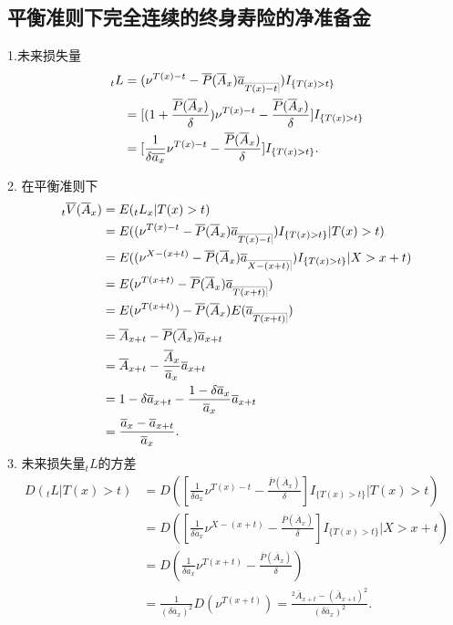 \documentclass[lang=cn,10pt]{elegantbook}
\makeatletter
\DeclareRobustCommand{\annu}[1]{_{%
    \def\arraystretch{0}%
    \setlength\arraycolsep{1pt}%
    \setlength\arrayrulewidth{.2pt}%
    \begin{array}[b]{@{}c|}\hline
        \\[\arraycolsep]%
        \scriptstyle #1%
    \end{array}%
}}
\makeatother
\begin{document}
\subsection{平衡准则下完全连续的终身寿险的净准备金}
\begin{proposition}
    1.未来损失量
\begin{align*}
    {}_tL&=(\nu^{T(x)-t}-\overline{P}( \overline{A}_x )\overline a_{\annu {T(x)-t}})I_{\{T(x)>t\}} \\
                        &= [(1+\frac{\overline{P}( \overline{A}_x )}{\delta})\nu^{T(x)-t}-\frac{\overline{P}( \overline{A}_x )}{\delta} ] I_{\{T(x)>t\}}\\
                        &= [\frac{1}{\delta\overline{a_x}}\nu^{T(x)-t}-\frac{\overline{P}( \overline{A}_x )}{\delta} ]I_{\{T(x)>t\}}.
\end{align*}

2. 在平衡准则下
\begin{align*}
    {}_t\overline V(\overline A_x)&=E({}_tL_x|T(x)>t) \\
                        &=E ( (\nu^{T(x)-t}-\overline{P}( \overline{A}_x )\overline a_{\annu {T(x)-t}} )I_{\{T(x)>t\}}|T(x)>t )\\
                        &=E ( (\nu^{X-(x+t)}-\overline{P}( \overline{A}_x )\overline a_{\annu {X-(x+t)}} )I_{\{T(x)>t\}}|X>x+t )\\
                        &=E (\nu^{T(x+t)}-\overline{P}( \overline{A}_x )\overline a_{\annu {T(x+t)}} )\\
                        &=E(\nu^{T(x+t)})-\overline{P}( \overline{A}_x )E(\overline a_{\annu {T(x+t)}})\\
                        &=\overline A_{x+t}-\overline{P}( \overline{A}_x )\overline a_{x+t}\\
                        &=\overline A_{x+t}-\frac{\overline A_x}{\overline a_x}\overline a_{x+t}\\
                        &=1-\delta\overline a_{x+t}-\frac{1-\delta \overline a_x}{\overline a_x}\overline a_{x+t}\\
                        &=\frac{\overline a_x-\overline a_{x+t}}{\overline a_x}.
\end{align*}
3. 未来损失量$_tL$的方差
\begin{align*}
    D(_tL|T(x)>t) &=D ( [\frac{1}{\delta\overline{a}_x}\nu^{T(x)-t}-\frac{\overline{P}( \overline{A}_x )}{\delta} ]I_{\{T(x)>t\}}|T(x)>t )\\
                        &=D ( [\frac{1}{\delta\overline{a}_x}\nu^{X-(x+t)}-\frac{\overline{P}( \overline{A}_x )}{\delta} ]I_{\{T(x)>t\}}|X>x+t )\\
                        &=D (\frac{1}{\delta\overline{a}_x}\nu^{T(x+t)}-\frac{\overline{P}( \overline{A}_x )}{\delta} )\\
                        &=\frac{1}{(\delta\overline a_x)^2}D(\nu^{T(x+t)})=\frac{^2\overline A_{x+t}-(\overline A_{x+t})^2}{(\delta\overline a_x)^2}.                 \end{align*}
\end{proposition}
\end{document}
